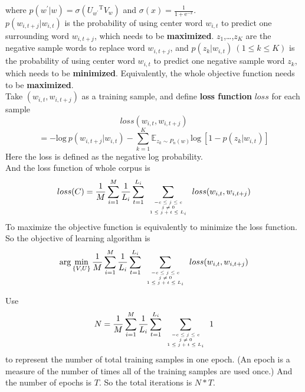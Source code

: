 \documentclass[12pt,a4paper,twoside]{book}
\begin{document}
where $p(w^\prime|w) = \sigma({U_{w^\prime}}^{\mathrm{T}}V_w)$
 and $\sigma(x) = \frac{1}{1+\mathrm{e}^{-x}}$.\\
 
 $p(w_{i,t+j}|w_{i,t})$ is the probability of using center word $w_{i,t}$ to predict one surrounding word $w_{i,t+j}$, which needs to be \textbf{maximized}.
$z_1$,\ldots,$z_K$ are the negative sample words to replace word $w_{i,t+j}$, and $p(z_k|w_{i,t})\ (1\leq k\leq K)$ is the probability of using center word $w_{i,t}$ to predict one negative sample word $z_k$, which needs to be \textbf{minimized}. Equivalently, the whole objective function needs to be \textbf{maximized}. \\ 

Take $(w_{i,t},w_{i,t+j})$ as a training sample, and define \textbf{loss function} $loss$ for each sample 
$$loss(w_{i,t},w_{i,t+j})$$
$$ = -\mathrm{log}\ p(w_{i,t+j}|w_{i,t})-\sum\limits_{k=1}^K\mathbb{E}_{z_k\sim P_n(w)}\mathrm{log}\ [1-p(z_k|w_{i,t})] $$
Here the loss is defined as the negative log probability. \\

	And the loss function of whole corpus is $$loss(C)=\frac{1}{M}\sum_{i=1}^M\frac{1}{L_i}\sum_{t=1}^{L_i}\sum\limits_{\mbox{\tiny$\begin{array}{c}-c\leq j \leq c\\ j\neq 0\\ 1\leq j+t\leq L_i\end{array}$}}loss(w_{i,t},w_{i,t+j})$$
	To maximize the objective function is equivalently to minimize the loss function. So the objective of learning algorithm is 
	$$\arg\min_{\{V,U\}} \frac{1}{M}\sum_{i=1}^M\frac{1}{L_i}\sum_{t=1}^{L_i}\sum\limits_{\mbox{\tiny$\begin{array}{c}-c\leq j \leq c\\ j\neq 0\\ 1\leq j+t\leq L_i\end{array}$}}loss(w_{i,t},w_{i,t+j})$$ 

	Use 
	$$N = \frac{1}{M}\sum_{i=1}^M\frac{1}{L_i}\sum_{t=1}^{L_i}\sum\limits_{\mbox{\tiny$\begin{array}{c}-c\leq j \leq c\\ j\neq 0\\ 1\leq j+t\leq L_i\end{array}$}} 1$$
	to represent the number of total training samples in one epoch. (An epoch is a measure of the number of times all of the training samples are used once.) And the number of epochs is $T$. So the total iterations is $N*T$.\\
	
\end{document}
